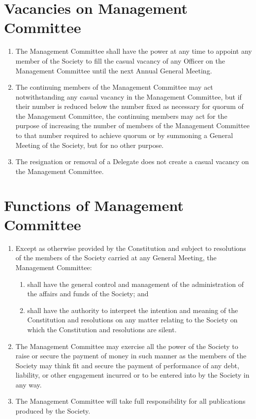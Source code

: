 \documentclass[a4paper]{article}
\newcommand*{\sectionr}[1]{{\raggedright \section{#1}}}
\begin{document}
\sectionr{Vacancies on Management Committee}
\begin{enumerate}
\item The Management Committee shall have the power at any time to appoint any member of the Society to fill the casual vacancy of any Officer on the Management Committee until the next Annual General Meeting.
\item The continuing members of the Management Committee may act notwithstanding any casual vacancy in the Management Committee, but if their number is reduced below the number fixed as necessary for quorum of the Management Committee, the continuing members may act for the purpose of increasing the number of members of the Management Committee to that number required to achieve quorum or by summoning a General Meeting of the Society, but for no other purpose.
\item The resignation or removal of a Delegate does not create a casual vacancy on the Management Committee.
\end{enumerate}

\sectionr{Functions of Management Committee}
\begin{enumerate}
\item Except as otherwise provided by the Constitution and subject to resolutions of the members of the Society carried at any General Meeting, the Management Committee:
	\begin{enumerate}
	\item shall have the general control and management of the administration of the affairs and funds of the Society; and
	\item shall have the authority to interpret the intention and meaning of the Constitution and resolutions on any matter relating to the Society on which the Constitution and resolutions are silent.
	\end{enumerate}
\item The Management Committee may exercise all the power of the Society to raise or secure the payment of money in such manner as the members of the Society may think fit and secure the payment of performance of any debt, liability, or other engagement incurred or to be entered into by the Society in any way.
\item The Management Committee will take full responsibility for all publications produced by the Society.
\end{enumerate}
\end{document}
